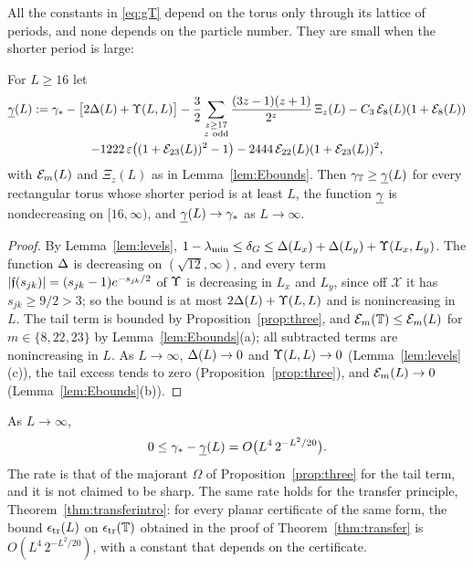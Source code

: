 All the constants in \eqref{eq:gT} depend on the torus only through its lattice of periods, and none depends on the
particle number. They are small when the shorter period is large:

\begin{corollary}\label{cor:uniform}
For $L\ge16$ let
\begin{multline*}
\underline{\gamma}(L):=\gamma_{*}-\bigl[2\Delta(L)+\Upsilon(L,L)\bigr]-\frac32\sum_{\substack{z\ge17\\ z\ \mathrm{odd}}}\frac{(3z-1)(z+1)}{2^z}\,\Xi_z(L)
-C_{3}\,\mathcal{E}_8(L)(1+\mathcal{E}_8(L))\\
-1222\,\varepsilon\bigl((1+\mathcal{E}_{23}(L))^2-1\bigr)-2444\,\mathcal{E}_{22}(L)(1+\mathcal{E}_{23}(L))^2,
\end{multline*}
with $\mathcal{E}_m(L)$ and $\Xi_z(L)$ as in Lemma~\ref{lem:Ebounds}. Then $\gamma_{\mathbb{T}}\ge\underline{\gamma}(L)$ for every rectangular torus whose shorter period
is at least $L$, the function $\underline{\gamma}$ is nondecreasing on $[16,\infty)$, and $\underline{\gamma}(L)\to\gamma_{*}$ as $L\to\infty$.
\end{corollary}

\begin{proof}
By Lemma~\ref{lem:levels}, $1-\lambda_{\min}\le\delta_G\le\Delta(L_x)+\Delta(L_y)+\Upsilon(L_x,L_y)$. The function $\Delta$ is decreasing on
$(\sqrt{12},\infty)$, and every term $\lvert\mathfrak f(s_{jk})\rvert=(s_{jk}-1)e^{-s_{jk}/2}$ of $\Upsilon$ is decreasing in $L_x$ and $L_y$, since off
$\mathcal X$ it has $s_{jk}\ge9/2>3$; so the bound is at most $2\Delta(L)+\Upsilon(L,L)$ and is nonincreasing in $L$. The tail term is
bounded by Proposition~\ref{prop:three}, and $\mathcal{E}_m(\mathbb{T})\le\mathcal{E}_m(L)$ for $m\in\{8,22,23\}$ by Lemma~\ref{lem:Ebounds}(a); all
subtracted terms are nonincreasing in $L$. As $L\to\infty$, $\Delta(L)\to0$ and $\Upsilon(L,L)\to0$ (Lemma~\ref{lem:levels}(c)), the tail
excess tends to zero (Proposition~\ref{prop:three}), and $\mathcal{E}_m(L)\to0$ (Lemma~\ref{lem:Ebounds}(b)).
\end{proof}

\begin{remark}\label{rem:rate}
As $L\to\infty$,
\[
0\le\gamma_{*}-\underline{\gamma}(L)=O\bigl(L^4\,2^{-L^2/20}\bigr).
\]
The rate is that of the majorant $\Omega$ of Proposition~\ref{prop:three} for the tail term, and it is not claimed to be sharp.
The same rate holds for the transfer principle, Theorem~\ref{thm:transferintro}: for every planar certificate of the same form,
the bound $\epsilon_{\mathrm{tr}}(L)$ on $\epsilon_{\mathrm{tr}}(\mathbb{T})$ obtained in the proof of Theorem~\ref{thm:transfer} is $O(L^4\,2^{-L^2/20})$, with a
constant that depends on the certificate.
\end{remark}

